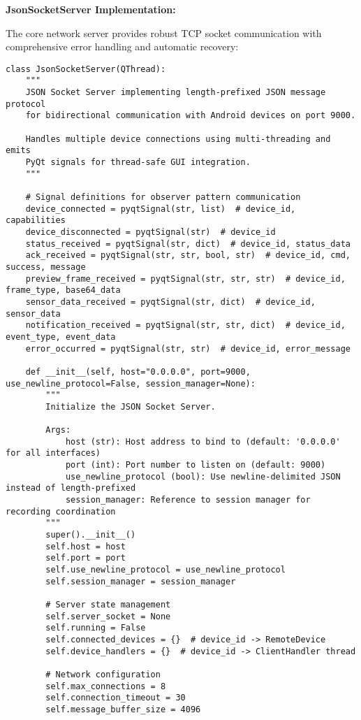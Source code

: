 \documentclass[12pt,a4paper]{article}
\begin{document}
\textbf{JsonSocketServer Implementation:}

The core network server provides robust TCP socket communication with comprehensive error handling and automatic
recovery:

\begin{verbatim}
class JsonSocketServer(QThread):
    """
    JSON Socket Server implementing length-prefixed JSON message protocol
    for bidirectional communication with Android devices on port 9000.
    
    Handles multiple device connections using multi-threading and emits
    PyQt signals for thread-safe GUI integration.
    """

    # Signal definitions for observer pattern communication
    device_connected = pyqtSignal(str, list)  # device_id, capabilities
    device_disconnected = pyqtSignal(str)  # device_id
    status_received = pyqtSignal(str, dict)  # device_id, status_data
    ack_received = pyqtSignal(str, str, bool, str)  # device_id, cmd, success, message
    preview_frame_received = pyqtSignal(str, str, str)  # device_id, frame_type, base64_data
    sensor_data_received = pyqtSignal(str, dict)  # device_id, sensor_data
    notification_received = pyqtSignal(str, str, dict)  # device_id, event_type, event_data
    error_occurred = pyqtSignal(str, str)  # device_id, error_message

    def __init__(self, host="0.0.0.0", port=9000, use_newline_protocol=False, session_manager=None):
        """
        Initialize the JSON Socket Server.
        
        Args:
            host (str): Host address to bind to (default: '0.0.0.0' for all interfaces)
            port (int): Port number to listen on (default: 9000)
            use_newline_protocol (bool): Use newline-delimited JSON instead of length-prefixed
            session_manager: Reference to session manager for recording coordination
        """
        super().__init__()
        self.host = host
        self.port = port
        self.use_newline_protocol = use_newline_protocol
        self.session_manager = session_manager

        # Server state management
        self.server_socket = None
        self.running = False
        self.connected_devices = {}  # device_id -> RemoteDevice
        self.device_handlers = {}  # device_id -> ClientHandler thread

        # Network configuration
        self.max_connections = 8
        self.connection_timeout = 30
        self.message_buffer_size = 4096


\end{verbatim}
\end{document}
